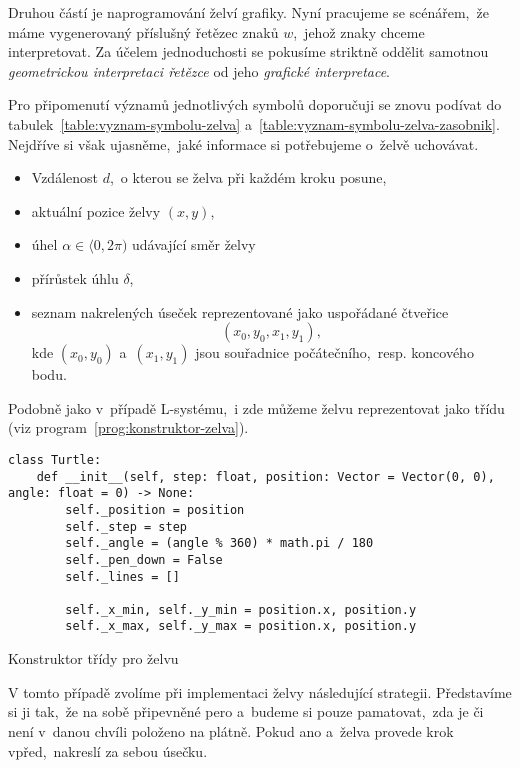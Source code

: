 Druhou částí je naprogramování želví grafiky. Nyní pracujeme se scénářem,~že máme vygenerovaný příslušný řetězec znaků $w$,~jehož znaky chceme interpretovat. Za účelem jednoduchosti se pokusíme striktně oddělit samotnou \emph{geometrickou interpretaci řetězce} od jeho \emph{grafické interpretace}.

Pro připomenutí významů jednotlivých symbolů doporučuji se znovu podívat do tabulek~\ref{table:vyznam-symbolu-zelva} a~\ref{table:vyznam-symbolu-zelva-zasobnik}. Nejdříve si však ujasněme,~jaké informace si potřebujeme o~želvě uchovávat.
\begin{itemize}
    \item Vzdálenost $d$,~o kterou se želva při každém kroku posune,
    \item aktuální pozice želvy $(x,y)$,
    \item úhel $\alpha\in\langle 0,2\pi)$ udávající směr želvy
    \item přírůstek úhlu $\delta$,
    \item seznam nakrelených úseček reprezentované jako uspořádané čtveřice
    \[(x_0,y_0,x_1,y_1),\]
    kde $(x_0,y_0)$ a~$(x_1,y_1)$ jsou souřadnice počátečního,~resp. koncového bodu.
\end{itemize}
Podobně jako v~případě L-systému,~i zde můžeme želvu reprezentovat jako třídu (viz program~\ref{prog:konstruktor-zelva}).
\begin{program}[h]
\begin{lstlisting}[style=python]
class Turtle:
    def __init__(self, step: float, position: Vector = Vector(0, 0), angle: float = 0) -> None:
        self._position = position
        self._step = step
        self._angle = (angle % 360) * math.pi / 180
        self._pen_down = False
        self._lines = []

        self._x_min, self._y_min = position.x, position.y
        self._x_max, self._y_max = position.x, position.y
\end{lstlisting}
    \caption{Konstruktor třídy pro želvu}
    \label{prog:konstruktor-zelva}
\end{program}

V tomto případě zvolíme při implementaci želvy následující strategii. Představíme si ji tak,~že na sobě připevněné pero a~budeme si pouze pamatovat,~zda je či není v~danou chvíli položeno na plátně. Pokud ano a~želva provede krok vpřed,~nakreslí za sebou úsečku.

